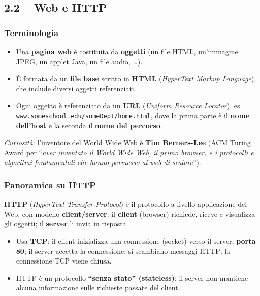 \documentclass[12pt, a4paper]{article}
\begin{document}
\subsection{2.2 -- Web e HTTP}

\subsubsection{Terminologia}

\begin{itemize}
    \item Una \textbf{pagina web} è costituita da \textbf{oggetti} (un file HTML, un'immagine JPEG, un applet Java, un file audio, \dots).
    \item È formata da un \textbf{file base} scritto in \textbf{HTML} (\textit{HyperText Markup Language}), che include diversi oggetti referenziati.
    \item Ogni oggetto è referenziato da un \textbf{URL} (\textit{Uniform Resource Locator}), es. \texttt{www.someschool.edu/someDept/home.html}, dove la prima parte è il \textbf{nome dell'host} e la seconda il \textbf{nome del percorso}.
\end{itemize}

\textit{Curiosità}: l'inventore del World Wide Web è \textbf{Tim Berners-Lee} (ACM Turing Award per ``\textit{aver inventato il World Wide Web, il primo browser, e i protocolli e algoritmi fondamentali che hanno permesso al web di scalare}'').

\subsubsection{Panoramica su HTTP}

\textbf{HTTP} (\textit{HyperText Transfer Protocol}) è il protocollo a livello applicazione del Web, con modello \textbf{client/server}: il \textbf{client} (browser) richiede, riceve e visualizza gli oggetti; il \textbf{server} li invia in risposta.

\begin{itemize}
    \item Usa \textbf{TCP}: il client inizializza una connessione (socket) verso il server, \textbf{porta 80}; il server accetta la connessione; si scambiano messaggi HTTP; la connessione TCP viene chiusa.
    \item HTTP è un protocollo \textcolor{red!70!black}{\textbf{``senza stato'' (stateless)}}: il server non mantiene alcuna informazione sulle richieste passate del client.
\end{itemize}
\end{document}
